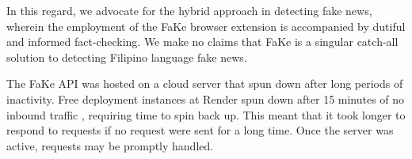 In this regard, we advocate for the hybrid approach in detecting fake news, wherein the employment of the FaKe browser extension is accompanied by dutiful and informed fact-checking. We make no claims that FaKe is a singular catch-all solution to detecting Filipino language fake news.

The FaKe API was hosted on a cloud server that spun down after long periods of inactivity. Free deployment instances at Render spun down after 15 minutes of no inbound traffic \cite{render-docs}, requiring time to spin back up. This meant that it took longer to respond to requests if no request were sent for a long time. Once the server was active, requests may be promptly handled.